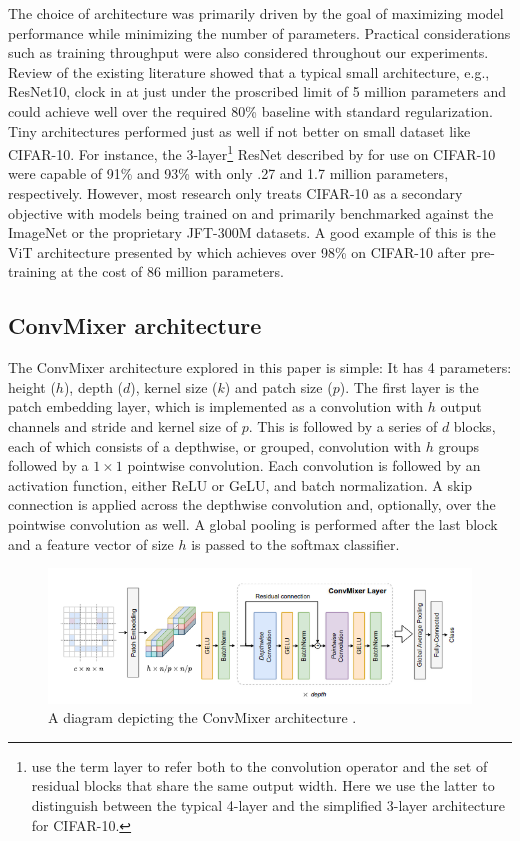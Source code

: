 \documentclass[letterpaper]{article} %
\begin{document}
The choice of architecture was primarily driven by the goal of maximizing model performance while minimizing the number of parameters. Practical considerations such as training throughput were also considered throughout our experiments. Review of the existing literature showed that a typical small architecture, e.g., ResNet10, clock in at just under the proscribed limit of 5 million parameters and could achieve well over the required 80\% baseline with standard regularization. Tiny architectures performed just as well if not better on small dataset like CIFAR-10. For instance, the 3-layer\footnote{\citet{He2015} use the term layer to refer both to the convolution operator and the set of residual blocks that share the same output width. Here we use the latter to distinguish between the typical 4-layer and the simplified 3-layer architecture for CIFAR-10.} ResNet described by \citet{He2015} for use on CIFAR-10 were capable of 91\% and 93\% with only .27 and 1.7 million parameters, respectively. However, most research only treats CIFAR-10 as a secondary objective with models being trained on and primarily benchmarked against the ImageNet or the proprietary JFT-300M datasets. A good example of this is the ViT architecture presented by \citet{Dosovitskiy2020} which achieves over 98\% on CIFAR-10 after pre-training at the cost of 86 million parameters.

\subsection{ConvMixer architecture}

The ConvMixer architecture explored in this paper is simple: It has 4 parameters: height ($h$), depth ($d$), kernel size ($k$) and patch size ($p$). The first layer is the patch embedding layer, which is implemented as a convolution with $h$ output channels and stride and kernel size of $p$. This is followed by a series of $d$ blocks, each of which consists of a depthwise, or grouped, convolution with $h$ groups followed by a $1 \times 1$ pointwise convolution. Each convolution is followed by an activation function, either ReLU or GeLU, and batch normalization. A skip connection is applied across the depthwise convolution and, optionally, over the pointwise convolution as well. A global pooling is performed after the last block and a feature vector of size $h$ is passed to the softmax classifier.

\begin{figure}
    \includegraphics[width=\linewidth]{convmixer_diagram.png}
    \caption{A diagram depicting the ConvMixer architecture \citep{trockman2022patches}.}
\end{figure}
\end{document}
